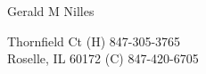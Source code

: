 \documentclass[12pt, letterpaper]{minimal}
\begin{document}

\newcommand{\huge}{\fontsize{24.88}{15}\selectfont}
\newcommand{\large}{\fontsize{17.28}{15}\selectfont}
\newcommand{\normal}{\fontsize{12}{15}\selectfont}


\newcommand{\myname}[1]{\huge \begin{center} #1  \end{center} \normal}
\newcommand{\myhead}[1]{ \vspace{0.5cm} \large #1 \normal }
\newcommand{\company}[1]{\vspace{0.2cm} \hspace*{0.5cm} \textbf{#1} }
\newcommand{\position}[2]{\hspace*{0.7cm} \emph{#1} \hfill #2  }
\newenvironment{skills}{\begin{list}{ $\circ$ \hspace{0.1cm}}{\setlength\leftmargin{1.5cm} \setlength\itemindent{-0.6cm}}  }{\end{list}}
\newcommand{\skill}[1]{ \item #1 }

\myname{Gerald M Nilles}
1623 Thornfield Ct  \hfill (H) 847-305-3765 \\
Roselle, IL 60172   \hfill (C) 847-420-6705 
\end{document}
